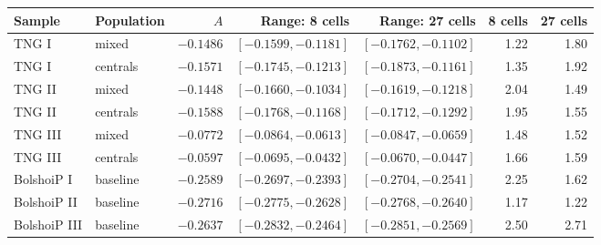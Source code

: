 \begin{tabular}{llrrrrr}
\toprule
Sample & Population & $A$ & Range: 8 cells & Range: 27 cells & 8 cells & 27 cells\\
\midrule
TNG I & mixed & $-0.1486$ & $[-0.1599, -0.1181]$ & $[-0.1762, -0.1102]$ & 1.22 & 1.80\\
TNG I & centrals & $-0.1571$ & $[-0.1745, -0.1213]$ & $[-0.1873, -0.1161]$ & 1.35 & 1.92\\
TNG II & mixed & $-0.1448$ & $[-0.1660, -0.1034]$ & $[-0.1619, -0.1218]$ & 2.04 & 1.49\\
TNG II & centrals & $-0.1588$ & $[-0.1768, -0.1168]$ & $[-0.1712, -0.1292]$ & 1.95 & 1.55\\
TNG III & mixed & $-0.0772$ & $[-0.0864, -0.0613]$ & $[-0.0847, -0.0659]$ & 1.48 & 1.52\\
TNG III & centrals & $-0.0597$ & $[-0.0695, -0.0432]$ & $[-0.0670, -0.0447]$ & 1.66 & 1.59\\
BolshoiP I & baseline & $-0.2589$ & $[-0.2697, -0.2393]$ & $[-0.2704, -0.2541]$ & 2.25 & 1.62\\
BolshoiP II & baseline & $-0.2716$ & $[-0.2775, -0.2628]$ & $[-0.2768, -0.2640]$ & 1.17 & 1.22\\
BolshoiP III & baseline & $-0.2637$ & $[-0.2832, -0.2464]$ & $[-0.2851, -0.2569]$ & 2.50 & 2.71\\
\bottomrule
\end{tabular}
